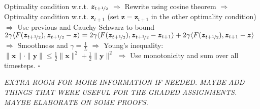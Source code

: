 \documentclass[8pt,a4paper]{extarticle}
\renewcommand{\proof}[1]{\begin{tcolorbox}#1 \hfill $\square$\end{tcolorbox}}
\renewcommand{\vec}[1]{\bm{#1}}
\newenvironment{topic}[1]
{\textbf{\sffamily \colorbox{black}{\rlap{\textbf{\textcolor{white}{#1}}}\hspace{\linewidth}\hspace{-2\fboxsep}}} \\ \vspace{0.2cm}}
{}
\begin{document}
\begin{multicols*}{2}
\begin{topic}{Variational inequalities}
\begin{itemize}
                  \proof{Optimality condition w.r.t. $\vec{z}_{t+\nicefrac{1}{2}}$ $\Rightarrow$ Rewrite using cosine theorem $\Rightarrow$ Optimality condition w.r.t. $\vec{z}_{t+1}$ (set $\vec{z} = \vec{z}_{t+1}$ in the other optimality condition) $\Rightarrow$ Use previous and Cauchy-Schwarz to bound $2 \gamma \langle F(\vec{z}_{t+\nicefrac{1}{2}}), \vec{z}_{t+\nicefrac{1}{2}} - \vec{z} \rangle = 2 \gamma \langle F(\vec{z}_{t+\nicefrac{1}{2}}), \vec{z}_{t+\nicefrac{1}{2}} - \vec{z}_{t+1} \rangle + 2 \gamma \langle F(\vec{z}_{t+\nicefrac{1}{2}}), \vec{z}_{t+1} - \vec{z} \rangle$ $\Rightarrow$ Smoothness and $\gamma = \frac{1}{L}$ $\Rightarrow$ Young's inequality: $\| \vec{x} \| \cdot \| \vec{y} \| \leq \frac{1}{2} \| \vec{x} \|^2 + \frac{1}{2} \| \vec{y} \|^2$ $\Rightarrow$ Use monotonicity and sum over all timesteps.}
        \end{itemize}
    \end{topic}

    \textit{EXTRA ROOM FOR MORE INFORMATION IF NEEDED. MAYBE ADD THINGS THAT WERE USEFUL FOR THE GRADED ASSIGNMENTS. MAYBE ELABORATE ON SOME PROOFS.}
\end{multicols*}

\newpage
\end{document}
